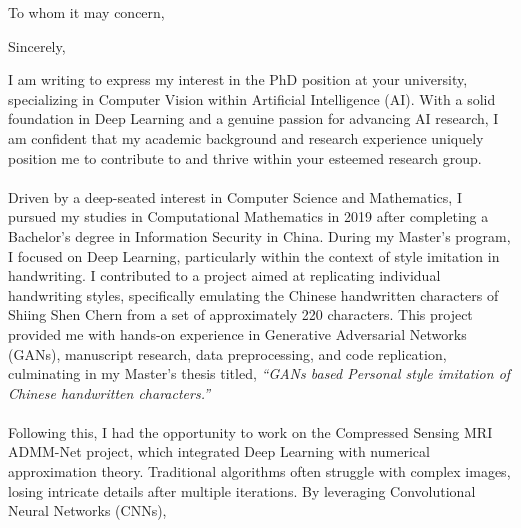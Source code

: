 \documentclass[11pt,a4paper, final]{moderncv}
\begin{document}
\date{\today}
\opening{To whom it may concern,} %
\closing{Sincerely,}
\makelettertitle
I am writing to express my interest in the PhD position at your university, 
specializing in Computer Vision within Artificial Intelligence (AI). 
With a solid foundation in Deep Learning and a genuine passion for advancing AI research, 
I am confident that my academic background and research experience uniquely position me 
to contribute to and thrive within your esteemed research group. 
\ \\
\ \\
Driven by a deep-seated interest in Computer Science and Mathematics, 
I pursued my studies in Computational Mathematics in 2019 
after completing a Bachelor's degree in Information Security in China. 
During my Master's program, I focused on Deep Learning, 
particularly within the context of style imitation in handwriting. 
I contributed to a project aimed at replicating individual handwriting styles, 
specifically emulating the Chinese handwritten characters of Shiing Shen Chern from a set of approximately 220 characters. 
This project provided me with hands-on experience in Generative Adversarial Networks (GANs), 
manuscript research, data preprocessing, and code replication, 
culminating in my Master's thesis titled, \emph{“GANs based Personal style imitation of Chinese handwritten characters.”}
\ \\
\ \\
Following this, I had the opportunity to work on the Compressed Sensing MRI ADMM-Net project, 
which integrated Deep Learning with numerical approximation theory. 
Traditional algorithms often struggle with complex images, losing intricate details after multiple iterations. 
By leveraging Convolutional Neural Networks (CNNs), 
\end{document}
